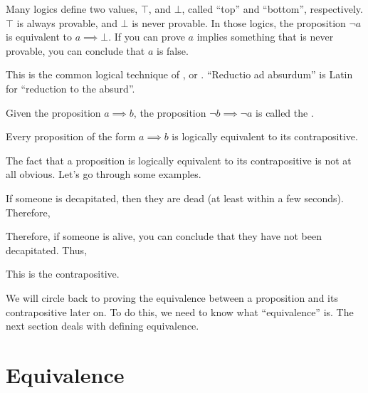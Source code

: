 Many logics define two values, $\top$, and $\bot$, called ``top'' and
``bottom'', respectively. $\top$ is always provable, and $\bot$ is
never provable. In those logics, the proposition $\lnot a$ is
equivalent to $a \implies \bot$. If you can prove $a$ implies
something that is never provable, you can conclude that $a$ is false.

This is the common logical technique of ,
or . ``Reductio ad absurdum'' is Latin
for ``reduction to the absurd''.

\begin{definition}
  Given the proposition $a \implies b$, the proposition
  $\lnot b \implies \lnot a$ is called the .
\end{definition}

\begin{theorem}
  \label{reductio-ad-absurdum}
  Every proposition of the form $a \implies b$ is logically equivalent
  to its contrapositive.
\end{theorem}

The fact that a proposition is logically equivalent to its
contrapositive is not at all obvious. Let's go through some examples.

\begin{example}
  If someone is decapitated, then they are dead (at least within a few
  seconds). Therefore,

  \begin{zz}
     \implies {}
  \end{zz}


  Therefore, if someone is alive, you can conclude that they have not
  been decapitated. Thus,

  \begin{zz}
     \implies {}
  \end{zz}

  This is the contrapositive.
\end{example}

We will circle back to proving the equivalence between a proposition
and its contrapositive later on. To do this, we need to know what
``equivalence'' is. The next section deals with defining equivalence.

\section{Equivalence}

